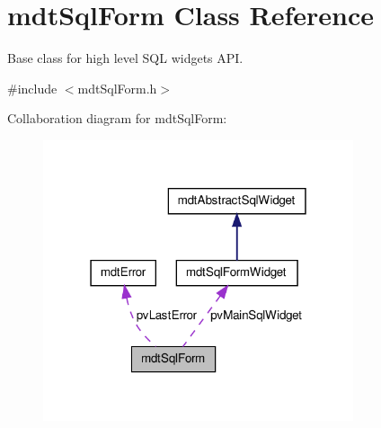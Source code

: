 \hypertarget{classmdt_sql_form}{
\section{mdtSqlForm Class Reference}
\label{classmdt_sql_form}
}


Base class for high level SQL widgets API.  




{\ttfamily \#include $<$mdtSqlForm.h$>$}



Collaboration diagram for mdtSqlForm:\nopagebreak
\begin{figure}[H]
\begin{center}
\leavevmode
\includegraphics[width=259pt]{classmdt_sql_form__coll__graph}
\end{center}
\end{figure}
